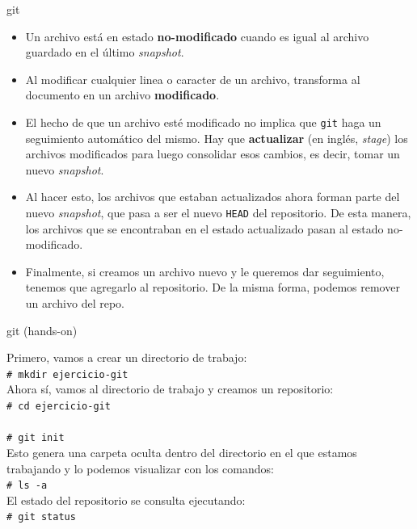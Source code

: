 \documentclass{beamer}
\newcommand{\shellcmd}[1]{\\\indent\indent\texttt{\footnotesize\# #1}\\}
\begin{document}
\begin{frame}{git}

\begin{itemize}
    \item Un archivo está en estado \textbf{no-modificado} cuando es igual al archivo guardado en el último \textit{snapshot}.
    \item Al modificar cualquier linea o caracter de un archivo, transforma al documento en un archivo \textbf{modificado}.
    \item El hecho de que un archivo esté modificado no implica que \texttt{git} haga un seguimiento automático del mismo. Hay que \textbf{actualizar} (en inglés, \textit{stage}) los archivos modificados para luego consolidar esos cambios, es decir, tomar un nuevo \textit{snapshot}.
    \item Al hacer esto, los archivos que estaban actualizados ahora forman parte del nuevo \textit{snapshot}, que pasa a ser el nuevo \texttt{HEAD} del repositorio. De esta manera, los archivos que se encontraban en el estado actualizado pasan al estado no-modificado.
    \item Finalmente, si creamos un archivo nuevo y le queremos dar seguimiento, tenemos que agregarlo al repositorio. De la misma forma, podemos remover un archivo del repo. 
\end{itemize}
\end{frame}


\begin{frame}{git (hands-on)}

  \noindent Primero, vamos a crear un directorio de trabajo:
  \shellcmd{mkdir ejercicio-git}
  
  \noindent Ahora sí, vamos al directorio de trabajo y creamos un repositorio:
  \shellcmd{cd ejercicio-git}
    \vspace{-.5cm}
  \shellcmd{git init}
  
  \noindent Esto genera una carpeta oculta dentro del directorio en el que estamos trabajando y lo podemos visualizar con los comandos:
  \shellcmd{ls -a}
  
  \noindent El estado del repositorio se consulta ejecutando:
  \shellcmd{git status}
  
\end{frame}
\end{document}
